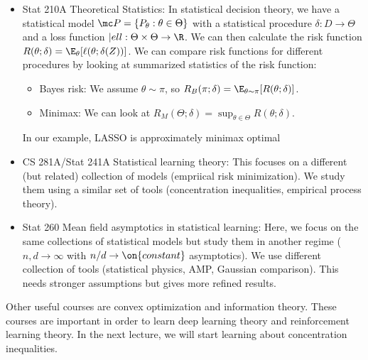 \begin{itemize}

\item Stat 210A Theoretical Statistics: In statistical decision theory, we have a statistical model $\mc P = \{ P_\theta : \theta \in \Theta\}$ with a statistical procedure $\delta : D \to \Theta$ and a loss function $|ell : \Theta \times \Theta \to \R$. We can then calculate the risk function $R(\theta;\delta) = \E_\theta[\ell(\theta; \delta(Z))]$. We can compare risk functions for different procedures by looking at summarized statistics of the risk function:

\begin{itemize}

\item Bayes risk: We assume $\theta \sim \pi$, so $R_B(\pi;\delta) = \E_{\theta \sim \pi}[R(\theta;\delta)]$.

\item Minimax: We can look at $R_M(\Theta;\delta) = \sup_{\theta \in \Theta} R(\theta; \delta)$.

\end{itemize}
In our example, LASSO is approximately minimax optimal

\item CS 281A/Stat 241A Statistical learning theory: This focuses on a different (but related) collection of models (empriical risk minimization). We study them using a similar set of tools (concentration inequalities, empirical process theory).

\item Stat 260 Mean field asymptotics in statistical learning: Here, we focus on the same collections of statistical models but study them in another regime ($n,d \to \infty$ with $n/d \to \on{constant}$ asymptotics). We use different collection of tools (statistical physics, AMP, Gaussian comparison). This needs stronger assumptions but gives more refined results.

\end{itemize}

Other useful courses are convex optimization and information theory. These courses are important in order to learn deep learning theory and reinforcement learning theory. In the next lecture, we will start learning about concentration inequalities.